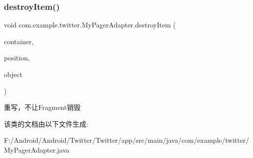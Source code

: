 \subsubsection{\texorpdfstring{destroy\+Item()}{destroyItem()}}
{\footnotesize\ttfamily void com.\+example.\+twitter.\+My\+Pager\+Adapter.\+destroy\+Item (\begin{DoxyParamCaption}\item[{View\+Group}]{container,  }\item[{int}]{position,  }\item[{Object}]{object }\end{DoxyParamCaption})\hspace{0.3cm}{\ttfamily [inline]}}

重写，不让\+Fragment销毁 

该类的文档由以下文件生成\+:\begin{DoxyCompactItemize}
\item 
F\+:/\+Android/\+Android/\+Twitter/\+Twitter/app/src/main/java/com/example/twitter/My\+Pager\+Adapter.\+java\end{DoxyCompactItemize}
